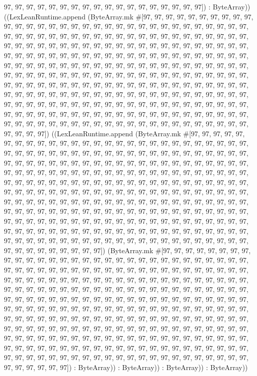 \documentclass[11pt]{article}
\begin{document}
97, 97, 97, 97, 97, 97, 97, 97, 97, 97, 97, 97, 97, 97, 97, 97, 97, 97]) : ByteArray)) ((LexLeanRuntime.append (ByteArray.mk \#[97, 97, 97, 97, 97, 97, 97, 97, 97, 97, 97, 97, 97, 97, 97, 97, 97, 97, 97, 97, 97, 97, 97, 97, 97, 97, 97, 97, 97, 97, 97, 97, 97, 97, 97, 97, 97, 97, 97, 97, 97, 97, 97, 97, 97, 97, 97, 97, 97, 97, 97, 97, 97, 97, 97, 97, 97, 97, 97, 97, 97, 97, 97, 97, 97, 97, 97, 97, 97, 97, 97, 97, 97, 97, 97, 97, 97, 97, 97, 97, 97, 97, 97, 97, 97, 97, 97, 97, 97, 97, 97, 97, 97, 97, 97, 97, 97, 97, 97, 97, 97, 97, 97, 97, 97, 97, 97, 97, 97, 97, 97, 97, 97, 97, 97, 97, 97, 97, 97, 97, 97, 97, 97, 97, 97, 97, 97, 97, 97, 97, 97, 97, 97, 97, 97, 97, 97, 97, 97, 97, 97, 97, 97, 97, 97, 97, 97, 97, 97, 97, 97, 97, 97, 97, 97, 97, 97, 97, 97, 97, 97, 97, 97, 97, 97, 97, 97, 97, 97, 97, 97, 97, 97, 97, 97, 97, 97, 97, 97, 97, 97, 97, 97, 97, 97, 97, 97, 97, 97, 97, 97, 97, 97, 97, 97, 97, 97, 97, 97, 97, 97, 97, 97, 97, 97, 97, 97, 97, 97, 97, 97, 97, 97, 97, 97, 97, 97, 97, 97, 97, 97, 97, 97, 97, 97, 97, 97, 97, 97, 97, 97, 97, 97, 97, 97, 97, 97, 97, 97, 97, 97, 97, 97, 97, 97, 97, 97, 97, 97, 97, 97, 97, 97, 97, 97, 97]) ((LexLeanRuntime.append (ByteArray.mk \#[97, 97, 97, 97, 97, 97, 97, 97, 97, 97, 97, 97, 97, 97, 97, 97, 97, 97, 97, 97, 97, 97, 97, 97, 97, 97, 97, 97, 97, 97, 97, 97, 97, 97, 97, 97, 97, 97, 97, 97, 97, 97, 97, 97, 97, 97, 97, 97, 97, 97, 97, 97, 97, 97, 97, 97, 97, 97, 97, 97, 97, 97, 97, 97, 97, 97, 97, 97, 97, 97, 97, 97, 97, 97, 97, 97, 97, 97, 97, 97, 97, 97, 97, 97, 97, 97, 97, 97, 97, 97, 97, 97, 97, 97, 97, 97, 97, 97, 97, 97, 97, 97, 97, 97, 97, 97, 97, 97, 97, 97, 97, 97, 97, 97, 97, 97, 97, 97, 97, 97, 97, 97, 97, 97, 97, 97, 97, 97, 97, 97, 97, 97, 97, 97, 97, 97, 97, 97, 97, 97, 97, 97, 97, 97, 97, 97, 97, 97, 97, 97, 97, 97, 97, 97, 97, 97, 97, 97, 97, 97, 97, 97, 97, 97, 97, 97, 97, 97, 97, 97, 97, 97, 97, 97, 97, 97, 97, 97, 97, 97, 97, 97, 97, 97, 97, 97, 97, 97, 97, 97, 97, 97, 97, 97, 97, 97, 97, 97, 97, 97, 97, 97, 97, 97, 97, 97, 97, 97, 97, 97, 97, 97, 97, 97, 97, 97, 97, 97, 97, 97, 97, 97, 97, 97, 97, 97, 97, 97, 97, 97, 97, 97, 97, 97, 97, 97, 97, 97, 97, 97, 97, 97, 97, 97, 97, 97, 97, 97, 97, 97, 97, 97, 97, 97, 97, 97]) (ByteArray.mk \#[97, 97, 97, 97, 97, 97, 97, 97, 97, 97, 97, 97, 97, 97, 97, 97, 97, 97, 97, 97, 97, 97, 97, 97, 97, 97, 97, 97, 97, 97, 97, 97, 97, 97, 97, 97, 97, 97, 97, 97, 97, 97, 97, 97, 97, 97, 97, 97, 97, 97, 97, 97, 97, 97, 97, 97, 97, 97, 97, 97, 97, 97, 97, 97, 97, 97, 97, 97, 97, 97, 97, 97, 97, 97, 97, 97, 97, 97, 97, 97, 97, 97, 97, 97, 97, 97, 97, 97, 97, 97, 97, 97, 97, 97, 97, 97, 97, 97, 97, 97, 97, 97, 97, 97, 97, 97, 97, 97, 97, 97, 97, 97, 97, 97, 97, 97, 97, 97, 97, 97, 97, 97, 97, 97, 97, 97, 97, 97, 97, 97, 97, 97, 97, 97, 97, 97, 97, 97, 97, 97, 97, 97, 97, 97, 97, 97, 97, 97, 97, 97, 97, 97, 97, 97, 97, 97, 97, 97, 97, 97, 97, 97, 97, 97, 97, 97, 97, 97, 97, 97, 97, 97, 97, 97, 97, 97, 97, 97, 97, 97, 97, 97, 97, 97, 97, 97, 97, 97, 97, 97, 97, 97, 97, 97, 97, 97, 97, 97, 97, 97, 97, 97, 97, 97, 97, 97, 97, 97, 97, 97, 97, 97, 97, 97, 97, 97, 97, 97, 97, 97, 97, 97, 97, 97, 97, 97, 97, 97, 97, 97, 97, 97, 97, 97, 97, 97, 97, 97, 97, 97, 97, 97, 97, 97, 97, 97, 97, 97, 97, 97, 97, 97, 97, 97, 97, 97]) : ByteArray)) : ByteArray)) : ByteArray)) : ByteArray)) 
\end{document}
